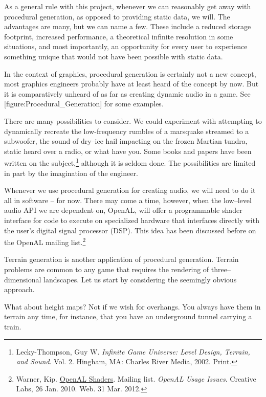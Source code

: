 As a general rule with this project, whenever we can reasonably get away with procedural generation, as opposed to providing static data, we will. The advantages are many, but we can name a few. These include a reduced storage footprint, increased performance, a theoretical infinite resolution in some situations, and most importantly, an opportunity for every user to experience something unique that would not have been possible with static data.

In the context of graphics, procedural generation is certainly not a new concept, most graphics engineers probably have at least heard of the concept by now. But it is comparatively unheard of as far as creating dynamic audio in a game. See [figure:Procedural_Generation] for some examples.

There are many possibilities to consider. We could experiment with attempting to dynamically recreate the low-frequency rumbles of a marsquake streamed to a subwoofer, the sound of dry--ice hail impacting on the frozen Martian tundra, static heard over a radio, or what have you. Some books and papers have been written on the subject,\footnote{Lecky-Thompson, Guy W. {\it Infinite Game Universe: Level Design, Terrain, and Sound}. Vol. 2. Hingham, MA: Charles River Media, 2002. Print.} although it is seldom done. The possibilities are limited in part by the imagination of the engineer.

Whenever we use procedural generation for creating audio, we will need to do it all in software -- for now. There may come a time, however, when the low--level audio API we are dependent on, OpenAL, will offer a programmable shader interface for code to execute on specialized hardware that interfaces directly with the user's digital signal processor (DSP). This idea has been discussed before on the OpenAL mailing list.\footnote{Warner, Kip. \href{http://opensource.creative.com/pipermail/openal/2010-January/011972.html}{OpenAL Shaders}. Mailing list. {\it OpenAL Usage Issues}. Creative Labs, 26 Jan. 2010. Web. 31 Mar. 2012.}

Terrain generation is another application of procedural generation. Terrain problems are common to any game that requires the rendering of three--dimensional landscapes. Let us start by considering the seemingly obvious approach.

What about height maps? Not if we wish for overhangs. You always have them in terrain any time, for instance, that you have an underground tunnel carrying a train.


